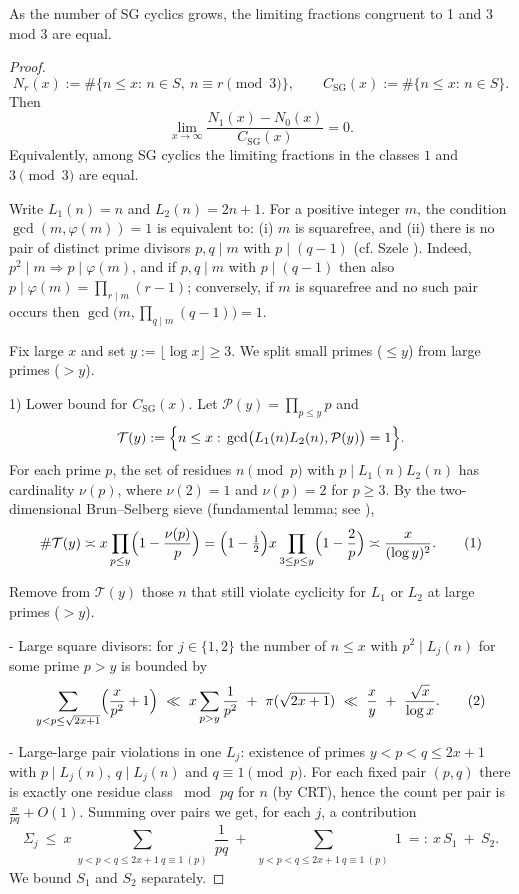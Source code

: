 \begin{theorem}\label{thm:sg_cyclics_modulo_3}
As the number of SG cyclics grows, the limiting fractions congruent to 1 and 3 mod 3 are equal.
\end{theorem}

\begin{proof}
\[N_r(x):=\#\{n\le x:\, n\in S,\ n\equiv r\pmod 3\},\qquad C_{\mathrm{SG}}(x):=\#\{n\le x:\, n\in S\}.
\]
Then
$$\lim_{x\to\infty}\frac{N_1(x)-N_0(x)}{C_{\mathrm{SG}}(x)}=0.$$
Equivalently, among SG cyclics the limiting fractions in the classes $1$ and $3\pmod3$ are equal.

Write $L_1(n)=n$ and $L_2(n)=2n+1$. For a positive integer $m$, the condition $\gcd(m,\varphi(m))=1$ is equivalent to: (i) $m$ is squarefree, and (ii) there is no pair of distinct prime divisors $p,q\mid m$ with $p\mid(q-1)$ (cf. Szele \cite{Szele1947}). Indeed, $p^2\mid m\Rightarrow p\mid\varphi(m)$, and if $p,q\mid m$ with $p\mid(q-1)$ then also $p\mid\varphi(m)=\prod_{r\mid m}(r-1)$; conversely, if $m$ is squarefree and no such pair occurs then $\gcd\bigl(m,\prod_{q\mid m}(q-1)\bigr)=1$.

Fix large $x$ and set $y:=\lfloor\log x\rfloor\ge3$. We split small primes ($\le y$) from large primes ($>y$).

1) Lower bound for $C_{\mathrm{SG}}(x)$. Let $\mathcal P(y)=\prod_{p\le y}p$ and
$$\mathcal T(y):=\Bigl\{n\le x:\, \gcd\bigl(L_1(n)L_2(n),\mathcal P(y)\bigr)=1\Bigr\}.$$
For each prime $p$, the set of residues $n\pmod p$ with $p\mid L_1(n)L_2(n)$ has cardinality $\nu(p)$, where $\nu(2)=1$ and $\nu(p)=2$ for $p\ge3$. By the two-dimensional Brun--Selberg sieve (fundamental lemma; see \cite{HalRich1974,Greaves2001,IK2004}),
$$\#\mathcal T(y)\asymp x\prod_{p\le y}\Bigl(1-\frac{\nu(p)}{p}\Bigr)=\Bigl(1-\tfrac12\Bigr)x\prod_{3\le p\le y}\Bigl(1-\frac{2}{p}\Bigr)\asymp \frac{x}{(\log y)^2}.\tag{1}$$

Remove from $\mathcal T(y)$ those $n$ that still violate cyclicity for $L_1$ or $L_2$ at large primes ($>y$).

- Large square divisors: for $j\in\{1,2\}$ the number of $n\le x$ with $p^2\mid L_j(n)$ for some prime $p>y$ is bounded by
\[\sum_{y<p\le\sqrt{2x+1}}\Bigl(\frac{x}{p^2}+1\Bigr)\ \ll\ x\sum_{p>y}\frac{1}{p^2}\ +\ \pi(\sqrt{2x+1})\ \ll\ \frac{x}{y}\ +\ \frac{\sqrt{x}}{\log x}.\tag{2}\]

- Large-large pair violations in one $L_j$: existence of primes $y<p<q\le 2x+1$ with $p\mid L_j(n)$, $q\mid L_j(n)$ and $q\equiv1\pmod p$. For each fixed pair $(p,q)$ there is exactly one residue class $\bmod\,pq$ for $n$ (by CRT), hence the count per pair is $\frac{x}{pq}+O(1)$. Summing over pairs we get, for each $j$, a contribution
\[\Sigma_j\ \le\ x\sum_{\substack{y<p<q\le 2x+1\ q\equiv1\ (p)}}\frac{1}{pq}\ +\ \sum_{\substack{y<p<q\le 2x+1\ q\equiv1\ (p)}}1\ =:\ x\,S_1\ +\ S_2.\]
We bound $S_1$ and $S_2$ separately.


\end{proof}
